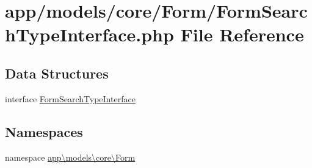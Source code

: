 \hypertarget{_form_search_type_interface_8php}{\section{app/models/core/\-Form/\-Form\-Search\-Type\-Interface.php File Reference}
\label{_form_search_type_interface_8php}
}
\subsection*{Data Structures}
\begin{DoxyCompactItemize}
\item 
interface \hyperlink{interfaceapp_1_1models_1_1core_1_1_form_1_1_form_search_type_interface}{Form\-Search\-Type\-Interface}
\end{DoxyCompactItemize}
\subsection*{Namespaces}
\begin{DoxyCompactItemize}
\item 
namespace \hyperlink{namespaceapp_1_1models_1_1core_1_1_form}{app\textbackslash{}models\textbackslash{}core\textbackslash{}\-Form}
\end{DoxyCompactItemize}
